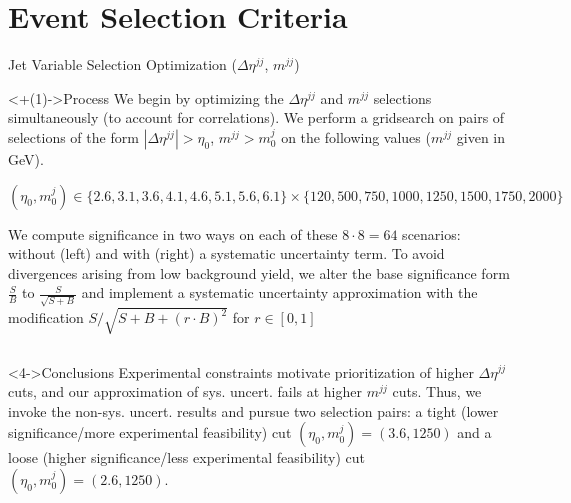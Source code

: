 \documentclass[]{beamer}
\begin{document}
%
%
\section{Event Selection Criteria}

\begin{frame}{Jet Variable Selection Optimization ($\Delta \eta^{jj}$, $m^{jj}$)}
    \begin{block}<+(1)->{Process}
        We begin by optimizing the $\Delta \eta^{jj}$ and $m^{jj}$ selections simultaneously (to account for correlations). We perform a gridsearch on pairs of selections of the form $|\Delta \eta^{jj}| > \eta_0$, $m^{jj} > m^j_0$ on the following values ($m^{jj}$ given in GeV).
        
        \smallskip
        
        $(\eta_0, m^j_0) \in \{2.6, 3.1, 3.6, 4.1, 4.6, 5.1, 5.6, 6.1\} \times \{120, 500, 750, 1000, 1250, 1500, 1750, 2000\}$
        
        \smallskip
        
        We compute significance in two ways on each of these $8 \cdot 8 = 64$ scenarios: without (left) and with (right) a systematic uncertainty term. To avoid divergences arising from low background yield, we alter the base significance form $\frac{S}{B}$ to $\frac{S}{\sqrt{S + B}}$ and implement a systematic uncertainty approximation with the modification $S/\sqrt{S + B + (r \cdot B)^2}$ for $r \in [0,1]$
    \end{block}
    \begin{columns}
    \end{columns}
    \begin{block}<4->{Conclusions}
        Experimental constraints motivate prioritization of higher $\Delta \eta^{jj}$ cuts, and our approximation of sys. uncert. fails at higher $m^{jj}$ cuts. Thus, we invoke the non-sys. uncert. results and pursue two selection pairs: a tight (lower significance/more experimental feasibility) cut $(\eta_0, m^j_0) = (3.6, 1250)$ and a loose (higher significance/less experimental feasibility) cut $(\eta_0, m^j_0) = (2.6, 1250)$.
    \end{block}
\end{frame}
\end{document}
